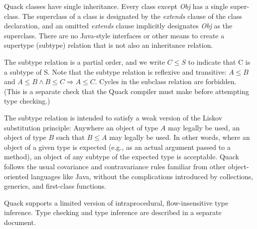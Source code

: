 \documentclass[11pt]{article}
\begin{document}
Quack classes have single inheritance.  Every class except \emph{Obj}
has a single super-class.  The superclass of a class is designated by
the \emph{extends} clause of the class declaration, and an omitted
\emph{extends} clause implicitly designates \emph{Obj} as the
superclass.   There are no Java-style interfaces or other
means to create a supertype (subtype) relation that is not also an
inheritance relation.   

The subtype relation is a partial order, and we write $C \le{} S$ to
indicate that C is a subtype of S.  Note that the subtype relation is
reflexive and transitive: $A \le{} B$ and $A \le{} B \land{} B \le{} C
\Rightarrow A \le C$.  Cycles in the subclass relation are
forbidden.  (This is a separate 
check that the Quack compiler must make before attempting type
checking.)   

The subtype relation is intended to satisfy a weak version of the Liskov substitution
principle:  Anywhere an object of type $A$ may legally be used, an
object of type $B$ such that $B \le{} A$ may legally be used.  In
other words, where an object of a given type is expected (e.g., as an
actual argument passed to a method), an object of any subtype of the
expected type is acceptable.     Quack follows the usual covariance
and contravariance rules familiar from other object-oriented
languages like Java, without the complications introduced by collections,
generics, and first-class functions. 

Quack supports a limited version of intraprocedural, flow-insensitive
type inference.  Type checking and type inference are described in a
separate document. 


\end{document}
